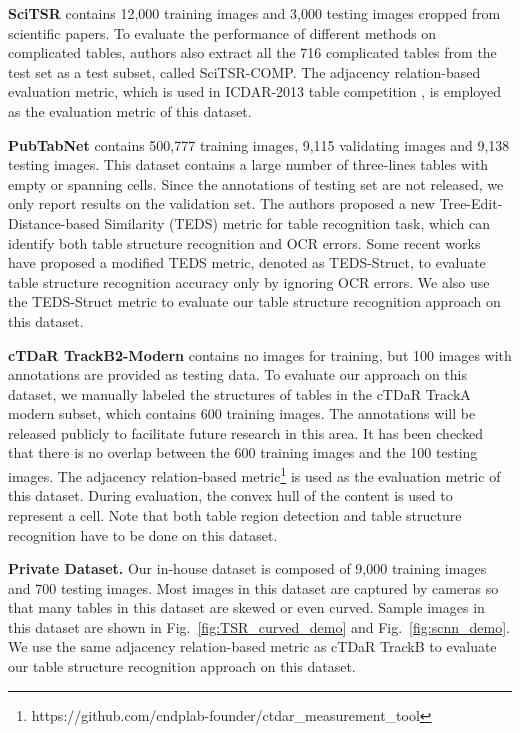 \documentclass[final,3p,times,twocolumn]{elsarticle}
\begin{document}
\textbf{SciTSR} \cite{chi2019complicated} contains 12,000 training images and 3,000 testing images cropped from scientific papers. To evaluate the performance of different methods on complicated tables, authors also extract all the 716 complicated tables from the test set as a test subset, called SciTSR-COMP. The adjacency relation-based evaluation metric, which is used in ICDAR-2013 table competition \cite{gobel2013icdar}, is employed as the evaluation metric of this dataset.

\textbf{PubTabNet} \cite{zhong2020image} contains 500,777 training images, 9,115 validating images and 9,138 testing images. This dataset contains a large number of three-lines tables with empty or spanning cells. Since the annotations of testing set are not released, we only report results on the validation set. The authors proposed a new Tree-Edit-Distance-based Similarity (TEDS) metric for table recognition task, which can identify both table structure recognition and OCR errors. Some recent works \cite{zheng2021global,raja2020table,qiao2021lgpma} have proposed a modified TEDS metric, denoted as TEDS-Struct, to evaluate table structure recognition accuracy only by ignoring OCR errors. We also use the TEDS-Struct metric to evaluate our table structure recognition approach on this dataset.

\textbf{cTDaR TrackB2-Modern} \cite{gao2019icdar} contains no images for training, but 100 images with annotations are provided as testing data. To evaluate our approach on this dataset, we manually labeled the structures of tables in the cTDaR TrackA modern subset, which contains 600 training images. The annotations will be released publicly to facilitate future research in this area. It has been checked that there is no overlap between the 600 training images and the 100 testing images. The adjacency relation-based metric\footnote{https://github.com/cndplab-founder/ctdar\_measurement\_tool} is used as the evaluation metric of this dataset. During evaluation, the convex hull of the content is used to represent a cell. Note that both table region detection and table structure recognition have to be done on this dataset.

\textbf{Private Dataset.} Our in-house dataset is composed of 9,000 training images and 700 testing images. Most images in this dataset are captured by cameras so that many tables in this dataset are skewed or even curved. Sample images in this dataset are shown in Fig.~\ref{fig:TSR_curved_demo} and Fig.~\ref{fig:scnn_demo}. We use the same adjacency relation-based metric as cTDaR TrackB to evaluate our table structure recognition approach on this dataset.
\end{document}
